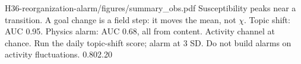 {H36-reorganization-alarm/figures/summary_obs.pdf}
{Susceptibility peaks near a transition. A goal change is a field step: it moves the mean, not $\chi$.}
{Topic shift: AUC 0.95. Physics alarm: AUC 0.68, all from content. Activity channel at chance.}
{Run the daily topic-shift score; alarm at 3 SD. Do not build alarms on activity fluctuations.}
{0.80}{2.20}
